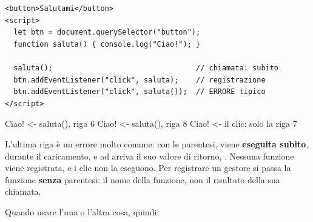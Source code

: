 \begin{affianco}[0.54][c]
\codicepiccolo
\begin{lstlisting}[style=html, name=chiamare-o-registrare.html]
<button>Salutami</button>
<script>
  let btn = document.querySelector("button");
  function saluta() { console.log("Ciao!"); }

  saluta();                                 // chiamata: subito
  btn.addEventListener("click", saluta);    // registrazione
  btn.addEventListener("click", saluta());  // ERRORE tipico
</script>
\end{lstlisting}
\begin{console}
Ciao!        <- saluta(), riga 6
Ciao!        <- saluta(), riga 8
Ciao!        <- il clic: solo la riga 7
\end{console}
\risultato
\begin{immagine}
\end{immagine}
\end{affianco}

L'ultima riga è un errore molto comune: con le parentesi, 
viene \textbf{eseguita subito}, durante il caricamento, e ad
 arriva il suo valore di ritorno, .
Nessuna funzione viene registrata, e i clic non la eseguono. Per registrare un
gestore si passa la funzione \textbf{senza} parentesi: il nome della funzione,
non il risultato della sua chiamata.

Quando usare l'una o l'altra cosa, quindi:

